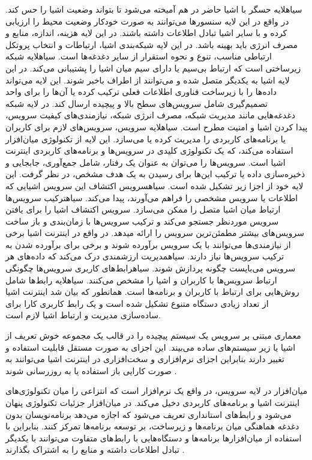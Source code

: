  ‌سیاه{لایه حسگر} با اشیا حاضر در هم آمیخته می‌شود تا بتواند وضعیت اشیا را حس کند. در واقع در این لایه سنسورها می‌توانند به صورت خودکار وضعیت محیط را ارزیابی کرده و با سایر اشیا تبادل اطلاعات داشته باشند.
در این لایه هزینه، اندازه، منابع و مصرف انرژی باید بهینه باشد. در این لایه شبکه‌بندی اشیا، ارتباطات و انتخاب پروتکل ارتباطی مناسب، تنوع و نحوه استقرار از سایر دغدغه‌ها است.
 ‌سیاه{لایه شبکه} زیرساختی است که ارتباط بی‌سیم یا دارای سیم میان اشیا را پشتیبانی می‌کند. در این لایه اشیا به یکدیگر متصل شده و می‌توانند از اطراف باخبر شوند. این لایه می‌تواند داده‌ها را با زیرساخت فناوری اطلاعات فعلی
ترکیب کرده یا آن‌ها را برای واحد تصمیم‌گیری شامل سرویس‌های سطح بالا و پیچیده ارسال کند. در لایه شبکه دغدغه‌هایی مانند مدیریت شبکه، مصرف انرژی شبکه، نیازمندی‌های کیفیت سرویس، پیدا کردن اشیا و امنیت مطرح است.
 ‌سیاه{لایه سرویس}، سرویس‌های لازم برای کاربران یا برنامه‌های کاربردی را مدیریت کرده یا می‌سازد. این لایه از تکنولوژی میان‌افزار استفاده می‌کند، که یک تکنولوژی کلیدی در سرویس‌ها و برنامه‌های کاربردی اینترنت اشیا است.
سرویس‌ها را می‌توان به عنوان یک رفتار، شامل جمع‌آوری، جابجایی و ذخیره‌سازی داده یا ترکیب این‌ها برای رسیدن به یک هدف مشخص، در نظر گرفت.
این لایه خود از اجزا زیر تشکیل شده است.
 ‌سیاه{سرویس اکتشاف} این سرویس اشیایی که اطلاعات یا سرویس مشخصی را فراهم می‌آورند، پیدا می‌کند.
 ‌سیاه{ترکیب سرویس‌ها} ارتباط میان اشیا متصل را ممکن می‌سازد. سرویس اکتشاف اشیا را برای یافتن سرویس موردنظر جستجو می‌کند و ترکیب سرویس‌ها با زمان‌بندی و باز ساخت سرویس‌های بیشتر مطمئن‌ترین سرویس را ارائه میدهد.
در واقع در اینترنت اشیا برخی از نیازمندی‌ها می‌توانند با یک سرویس برآورده شوند و برخی برای برآورده شدن به ترکیب سرویس‌ها نیاز دارند.
 ‌سیاه{مدیریت ارزشمندی} درک می‌کند که داده‌های هر سرویس می‌بایست چگونه پردازش شوند.
 ‌سیاه{رابط‌های کاربری سرویس‌ها} چگونگی ارتباط سرویس‌ها با کاربران و اشیا را مشخص می‌کنند.
 ‌سیاه{لایه رابط‌ها} شامل روش‌هایی برای ارتباط با کاربران و برنامه‌ها است. همانطور که بیان شد اینترنت اشیا از تعداد زیادی دستگاه متنوع تشکیل شده است و یک رابط کاربری کارا برای ساده‌سازی مدیریت و ارتباط اشیا لازم است.

معماری مبتنی بر سرویس یک سیستم پیچیده را در قالب یک مجموعه خوش تعریف از اشیا یا زیر سیستم‌های ساده می‌بیند.
این اجزای به صورت مستقل قابلیت استفاده و تغییر دارند بنابراین اجزای نرم‌افزاری و سخت‌افزاری در اینترنت اشیا می‌توانند به صورت کارایی
باز استفاده یا به روزرسانی شوند
.

میان‌افزار در لایه سرویس، در واقع یک نرم‌افزار است که انتزاعی را میان تکنولوژی‌های اینترنت اشیا و برنامه‌های کاربردی دخیل می‌کند.
در میان‌افزار جزئیات تکنولوژی پنهان می‌شود و رابط‌های استانداری تعریف می‌شود که اجازه می‌دهد برنامه‌نویسان بدون دغدغه هماهنگی میان برنامه‌ها و زیرساخت، بر توسعه برنامه‌ها تمرکز کنند.
بنابراین با استفاده از میان‌افزارها برنامه‌ها و دستگاه‌هایی با رابط‌های متفاوت می‌توانند با یکدیگر تبادل اطلاعات داشته و منابع را به اشتراک بگذارند
.

